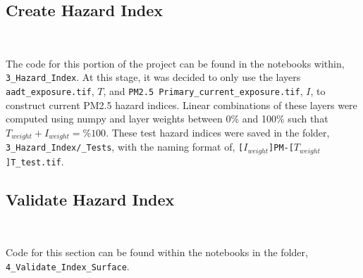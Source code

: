 \documentclass[article,12pt]{article}
\numberwithin{equation}{section}
\begin{document}
\subsection{Create Hazard Index}
\begin{adjustwidth}{-.88in}{-.88in}
	\begin{center}
		\\
		
	\end{center}
\end{adjustwidth}
\vspace{.5in}

The code for this portion of the project can be found in the notebooks within, \texttt{3\_Hazard\_Index}. At this stage, it was decided to only use the layers \texttt{aadt\_exposure.tif}, $T$, and \texttt{PM2.5 Primary\_current\_exposure.tif}, $I$, to construct current PM2.5 hazard indices. Linear combinations of these layers were computed using numpy and layer weights between 0\% and 100\% such that $T_{weight} + I_{weight} = \%100$. These test hazard indices were saved in the folder, \texttt{3\_Hazard\_Index/\_Tests}, with the naming format of, \texttt{[$I_{weight}$]PM-[$T_{weight}$]T\_test.tif}. 

\subsection{Validate Hazard Index}
\begin{adjustwidth}{-.88in}{-.88in}
	\begin{center}
		\\
		
	\end{center}
\end{adjustwidth}
\vspace{.5in}
Code for this section can be found within the notebooks in the folder, \texttt{4\_Validate\_Index\_Surface}. 
\end{document}
